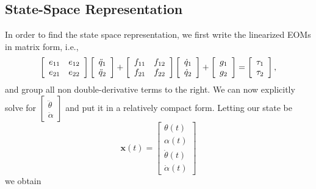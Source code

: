 \subsection{State-Space Representation}
In order to find the state space representation, we first write the linearized EOMs in matrix form, i.e.,
\[
    \left[\begin{array}{c c}
            e_{11} & e_{12} \\
            e_{21} & e_{22}
        \end{array}\right]
    \left[\begin{array}{c}
            \ddot{q}_{1} \\
            \ddot{q}_{2}
        \end{array}\right] +
    \left[\begin{array}{c c}
            f_{11} & f_{12} \\
            f_{21} & f_{22}
        \end{array}\right]
    \left[\begin{array}{c}
            \dot{q}_{1} \\
            \dot{q}_{2}
        \end{array}\right] +
    \left[\begin{array}{c}
            g_1 \\
            g_2
        \end{array}\right] =
    \left[\begin{array}{c}
            \tau_1 \\
            \tau_2
        \end{array}\right],
\]
and group all non double-derivative terms to the right. We can now explicitly solve for $\left[\begin{array}{c}
            \ddot{\theta} \\
            \ddot{\alpha}
        \end{array}\right]$ and put it in a relatively compact form. Letting our state be
\[
    \mathbf{x}(t) =
    \left[\begin{array}{c}
            \theta(t)       \\
            \alpha(t)       \\
            \dot{\theta}(t) \\
            \dot{\alpha}(t)
        \end{array}\right]
\]
we obtain
